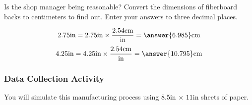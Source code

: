 \documentclass{ximera}
\begin{document}



\begin{question}\label{quest:qc150_3}
    Is the shop manager being reasonable?  Convert the  dimensions of fiberboard backs to centimeters to find out.  Enter your answers to three decimal places.

    $$2.75\text{in}=2.75\text{in}\times \frac{2.54\text{cm}}{\text{in}}=\answer{6.985}\text{cm}$$
    $$4.25\text{in}=4.25\text{in}\times \frac{2.54\text{cm}}{\text{in}}=\answer{10.795}\text{cm}$$
\end{question}

\subsubsection*{Data Collection Activity}
You will simulate this manufacturing process using $8.5$in $\times$ $11$in sheets of paper.
\end{document}
